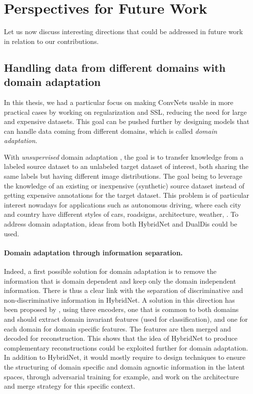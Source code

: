 \section{Perspectives for Future Work}

Let us now discuss interesting directions that could be addressed in future work in relation to our contributions.

\subsection*{Handling data from different domains with domain adaptation}

In this thesis, we had a particular focus on making \acp{ConvNet} usable in more practical cases by working on regularization and \ac{SSL}, reducing the need for large and expensive datasets. This goal can be pushed further by designing models that can handle data coming from different domains, which is called \textit{domain adaptation}.

With \textit{unsupervised} domain adaptation \citep{ben2010theory}, the goal is to transfer knowledge from a labeled source dataset to an unlabeled target dataset of interest, both sharing the same labels but having different image distributions. The goal being to leverage the knowledge of an existing or inexpensive (\eg synthetic) source dataset instead of getting expensive annotations for the target dataset. This problem is of particular interest nowadays for applications such as autonomous driving, where each city and country have different styles of cars, roadsigns, architecture, weather, \etc. To address domain adaptation, ideas from both HybridNet and DualDis could be used.

\paragraph{Domain adaptation through information separation.}
Indeed, a first possible solution for domain adaptation is to remove the information that is domain dependent and keep only the domain independent information. There is thus a clear link with the separation of discriminative and non-discriminative information in HybridNet. A solution in this direction has been proposed by \citet{Bousmalis2016a}, using three encoders, one that is common to both domains and should extract domain invariant features (used for classification), and one for each domain for domain specific features. The features are then merged and decoded for reconstruction. This shows that the idea of HybridNet to produce complementary reconstructions could be exploited further for domain adaptation. In addition to HybridNet, it would mostly require to design techniques to ensure the structuring of domain specific and domain agnostic information in the latent spaces, through adversarial training for example, and work on the architecture and merge strategy for this specific context.


